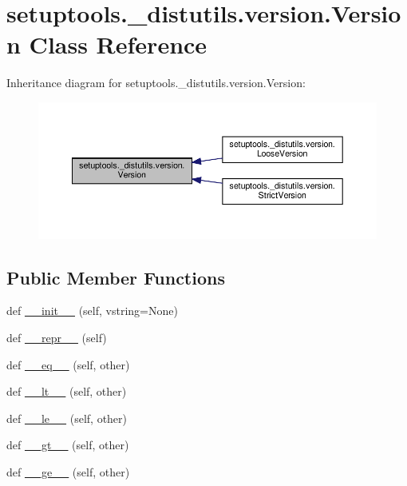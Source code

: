 \hypertarget{classsetuptools_1_1__distutils_1_1version_1_1Version}{}\section{setuptools.\+\_\+distutils.\+version.\+Version Class Reference}
\label{classsetuptools_1_1__distutils_1_1version_1_1Version}


Inheritance diagram for setuptools.\+\_\+distutils.\+version.\+Version\+:
\nopagebreak
\begin{figure}[H]
\begin{center}
\leavevmode
\includegraphics[width=350pt]{classsetuptools_1_1__distutils_1_1version_1_1Version__inherit__graph}
\end{center}
\end{figure}
\subsection*{Public Member Functions}
\begin{DoxyCompactItemize}
\item 
def \hyperlink{classsetuptools_1_1__distutils_1_1version_1_1Version_a3ee288ca127d8a189fee3cdc99ed0968}{\+\_\+\+\_\+init\+\_\+\+\_\+} (self, vstring=None)
\item 
def \hyperlink{classsetuptools_1_1__distutils_1_1version_1_1Version_a3db9358e1c528f3ca463821994e1358b}{\+\_\+\+\_\+repr\+\_\+\+\_\+} (self)
\item 
def \hyperlink{classsetuptools_1_1__distutils_1_1version_1_1Version_ab8b98d1d9f703fdbdca6c9dd7ed6c925}{\+\_\+\+\_\+eq\+\_\+\+\_\+} (self, other)
\item 
def \hyperlink{classsetuptools_1_1__distutils_1_1version_1_1Version_a27a37d7cbc34534cfaaeff4fb2dd119a}{\+\_\+\+\_\+lt\+\_\+\+\_\+} (self, other)
\item 
def \hyperlink{classsetuptools_1_1__distutils_1_1version_1_1Version_ae4692e367c2bf540392f46633238df8b}{\+\_\+\+\_\+le\+\_\+\+\_\+} (self, other)
\item 
def \hyperlink{classsetuptools_1_1__distutils_1_1version_1_1Version_a19a356ba3572c6fb38c128dd75345c20}{\+\_\+\+\_\+gt\+\_\+\+\_\+} (self, other)
\item 
def \hyperlink{classsetuptools_1_1__distutils_1_1version_1_1Version_a12aac652710730fa8c213cc78ba4701d}{\+\_\+\+\_\+ge\+\_\+\+\_\+} (self, other)
\end{DoxyCompactItemize}


